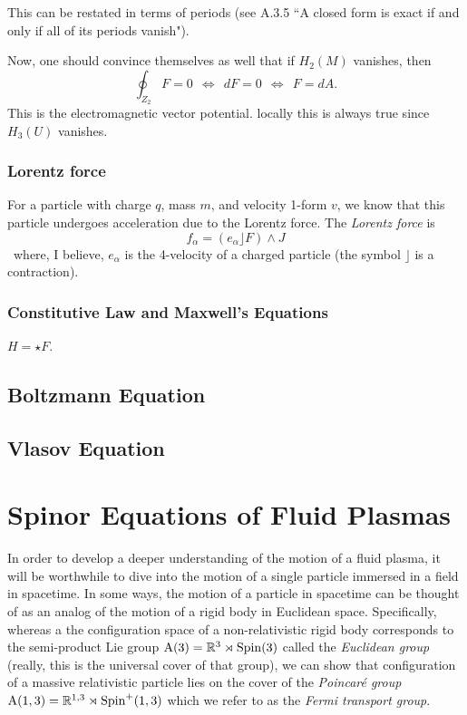 \documentclass[conf]{new-aiaa}
\begin{document}
\begin{remark}
This can be restated in terms of periods (see A.3.5 ``A closed form is exact if and only if all of its periods vanish"). 
\end{remark}

Now, one should convince themselves as well that if $H_2(M)$ vanishes, then
\begin{equation}
\label{eq:electromagnetic_potential}
\oint_{Z_2}F=0 ~~\iff~~ dF=0 ~~\iff~~ F=dA.
\end{equation}
This is the electromagnetic vector potential. locally this is always true since $H_3(U)$ vanishes.

\subsubsection{Lorentz force}
For a particle with charge $q$, mass $m$, and velocity 1-form $v$, we know that this particle undergoes acceleration due to the Lorentz force. The \emph{Lorentz force} is
\begin{equation}
    \label{eq:lorentz_force}
    f_\alpha = (e_\alpha \rfloor F)\wedge J
\end{equation}\
where, I believe, $e_\alpha$ is the 4-velocity of a charged particle (the symbol $\rfloor$ is a contraction).

\subsubsection{Constitutive Law and Maxwell's Equations}

$H=\star F$.

\subsection{Boltzmann Equation}

\subsection{Vlasov Equation}

\section{Spinor Equations of Fluid Plasmas}

In order to develop a deeper understanding of the motion of a fluid plasma, it will be worthwhile to dive into the motion of a single particle immersed in a field in spacetime. In some ways, the motion of a particle in spacetime can be thought of as an analog of the motion of a rigid body in Euclidean space. Specifically, whereas a the configuration space of a non-relativistic rigid body corresponds to the semi-product Lie group $\mathrm{A}(3)=\mathbb{R}^3 \rtimes \operatorname{Spin}(3)$ called the \emph{Euclidean group} (really, this is the universal cover of that group), we can show that configuration of a massive relativistic particle lies on the cover of the \emph{Poincar\'e group} $\mathrm{A}(1,3) = \mathbb{R}^{1,3} \rtimes \operatorname{Spin}^+(1,3)$ which we refer to as the \emph{Fermi transport group}.
\end{document}
